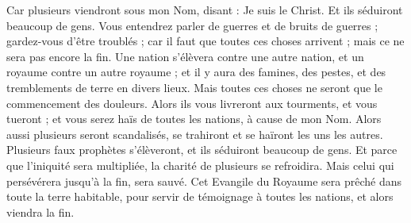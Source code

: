 \begin{multicols}{2}
Car plusieurs viendront sous mon Nom, disant : Je suis le Christ. Et ils séduiront beaucoup de gens.
Vous entendrez parler de guerres et de bruits de guerres ; gardez-vous d’être troublés ; car il faut que toutes ces choses arrivent ; mais ce ne sera pas encore la fin.
Une nation s'élèvera contre une autre nation, et un royaume contre un autre royaume ; et il y aura des famines, des pestes, et des tremblements de terre en divers lieux.
Mais toutes ces choses ne seront que le commencement des douleurs.
Alors ils vous livreront aux tourments, et vous tueront ; et vous serez haïs de toutes les nations, à cause de mon Nom.
Alors aussi plusieurs seront scandalisés, se trahiront et se haïront les uns les autres.
Plusieurs faux prophètes s'élèveront, et ils séduiront beaucoup de gens.
Et parce que l'iniquité sera multipliée, la charité de plusieurs se refroidira.
Mais celui qui persévérera jusqu'à la fin, sera sauvé.
Cet Evangile du Royaume sera prêché dans toute la terre habitable, pour servir de témoignage à toutes les nations, et alors viendra la fin.

\end{multicols}
